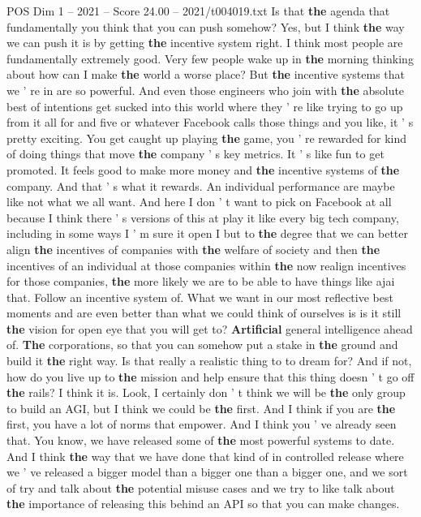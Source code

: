 \begin{textsample}{POS Dim 1 – 2021 – Score 24.00 – 2021/t004019.txt}
Is that \textbf{the} agenda that fundamentally you think that you can push somehow?
Yes, but I think \textbf{the} way we can push it is by getting \textbf{the} incentive system right.
I think most people are fundamentally extremely good.
Very few people wake up in \textbf{the} morning thinking about how can I make \textbf{the} world a worse place?
But \textbf{the} incentive systems that we ' re in are so powerful.
And even those engineers who join with \textbf{the} absolute best of intentions get sucked into this world where they ' re like trying to go up from it all for and five or whatever Facebook calls those things and you like, it ' s pretty exciting.
You get caught up playing \textbf{the} game, you ' re rewarded for kind of doing things that move \textbf{the} company ' s key metrics.
It ' s like fun to get promoted.
It feels good to make more money and \textbf{the} incentive systems of \textbf{the} company.
And that ' s what it rewards.
An individual performance are maybe like not what we all want.
And here I don ' t want to pick on Facebook at all because I think there ' s versions of this at play it like every big tech company, including in some ways I ' m sure it open I but to \textbf{the} degree that we can better align \textbf{the} incentives of companies with \textbf{the} welfare of society and then \textbf{the} incentives of an individual at those companies within \textbf{the} now realign incentives for those companies, \textbf{the} more likely we are to be able to have things like ajai that.
Follow an incentive system of.
What we want in our most reflective best moments and are even better than what we could think of ourselves is is it still \textbf{the} vision for open eye that you will get to? \textbf{Artificial} general intelligence ahead of. \textbf{The} corporations, so that you can somehow put a stake in \textbf{the} ground and build it \textbf{the} right way.
Is that really a realistic thing to to dream for?
And if not, how do you live up to \textbf{the} mission and help ensure that this thing doesn ' t go off \textbf{the} rails?
I think it is.
Look, I certainly don ' t think we will be \textbf{the} only group to build an AGI, but I think we could be \textbf{the} first.
And I think if you are \textbf{the} first, you have a lot of norms that empower.
And I think you ' ve already seen that.
You know, we have released some of \textbf{the} most powerful systems to date.
And I think \textbf{the} way that we have done that kind of in controlled release where we ' ve released a bigger model than a bigger one than a bigger one, and we sort of try and talk about \textbf{the} potential misuse cases and we try to like talk about \textbf{the} importance of releasing this behind an API so that you can make changes.

\end{textsample}
